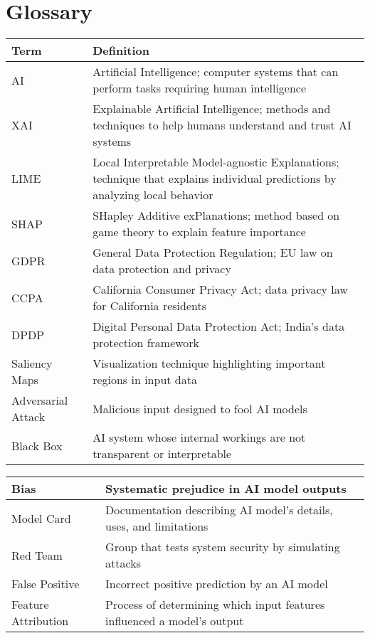 \documentclass[12pt]{article}
\begin{document}
\section{Glossary}
\begin{tabular}{|p{}|p{}|}
\hline
\textbf{Term} & \textbf{Definition} \\
\hline
AI & Artificial Intelligence; computer systems that can perform tasks requiring human intelligence \\
\hline
XAI & Explainable Artificial Intelligence; methods and techniques to help humans understand and trust AI systems \\
\hline
LIME & Local Interpretable Model-agnostic Explanations; technique that explains individual predictions by analyzing local behavior \\
\hline
SHAP & SHapley Additive exPlanations; method based on game theory to explain feature importance \\
\hline
GDPR & General Data Protection Regulation; EU law on data protection and privacy \\
\hline
CCPA & California Consumer Privacy Act; data privacy law for California residents \\
\hline
DPDP & Digital Personal Data Protection Act; India's data protection framework \\
\hline
Saliency Maps & Visualization technique highlighting important regions in input data \\
\hline
Adversarial Attack & Malicious input designed to fool AI models \\
\hline
Black Box & AI system whose internal workings are not transparent or interpretable \\
\hline
\end{tabular}

\begin{tabular}{|p{}|p{}|}
\hline
Bias & Systematic prejudice in AI model outputs \\
\hline
Model Card & Documentation describing AI model's details, uses, and limitations \\
\hline
Red Team & Group that tests system security by simulating attacks \\
\hline
False Positive & Incorrect positive prediction by an AI model \\
\hline
Feature Attribution & Process of determining which input features influenced a model's output \\
\hline
\end{tabular}
\end{document}
